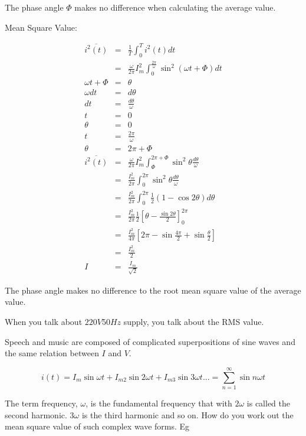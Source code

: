 \documentclass[a4paper,12pt]{article}
\begin{document}
The phase angle $\Phi$ makes no difference when calculating
the average value.

Mean Square Value:

\begin{eqnarray*}
\overline{i^{2}(t)} & = & \frac{1}{T} \int^{T}_{0} i^{2}(t) dt \\
						  & = & \frac{\omega}{2 \pi} I_{m}^{2} \int^{\frac{2
						  \pi}{\omega}}_{0} \sin^{2}(\omega t + \Phi) dt \\
\omega t + \Phi	  & = & \theta \\
\omega dt			  & = & d \theta \\
dt 					  & = & \frac{d \theta}{\omega} \\
t						  & = & 0 \\
\theta				  & = & 0 \\
t						  & = & \frac{2 \pi}{\omega} \\
\theta				  & = & 2 \pi + \Phi \\
\overline{i^{2}(t)} & = & \frac{\omega}{2 \pi} I_{m}^{2} \int^{2 \pi +
\Phi}_{\Phi} \sin^{2} \theta \frac{d \theta}{\omega} \\
						  & = & \frac{I_{m}^{2}}{2 \pi} \int^{2 \pi}_{0}
						  \sin^{2} \theta \frac{d \theta}{\omega} \\
						  & = & \frac{I_{m}^{2}}{2 \pi} \int^{2 \pi}_{0}
						  \frac{1}{2} \left( 1 - \cos 2 \theta \right) d
						  \theta \\
						  & = & \frac{I_{m}^{2}}{2 \pi} \frac{1}{2} \left[
						  \theta - \frac{\sin 2 \theta}{2} \right]^{2 \pi}_{0} \\
						  & = & \frac{I_{m}^{2}}{4 \pi} \left[ 2 \pi - \sin{\frac{4 \pi}{2}} + \sin{\frac{\theta}{2}} \right] \\
						  & = & \frac{I_{m}^{2}}{2} \\
I						  & = & \frac{I_{m}}{\sqrt{2}}
\end{eqnarray*}

The phase angle makes no difference to the root mean square
value of the average value.

When you talk about $220V 50Hz$ supply, you talk about the RMS
value.

Speech and music are composed of complicated superpositions of
sine waves and the same relation between $I$ and $V$.

\[ i(t) = I_{m} \sin{\omega t} + I_{m2} \sin{2 \omega t} + I_{m3} \sin{3
\omega t} ... = \sum^{\infty}_{n = 1} \sin{n \omega t} \]

The term frequency, $\omega$, is the fundamental frequency
that with $2 \omega$ is called the second harmonic. $3 \omega$ is the
third harmonic and so on. How do you work out the mean square value of
such complex wave forms. Eg 
\end{document}
